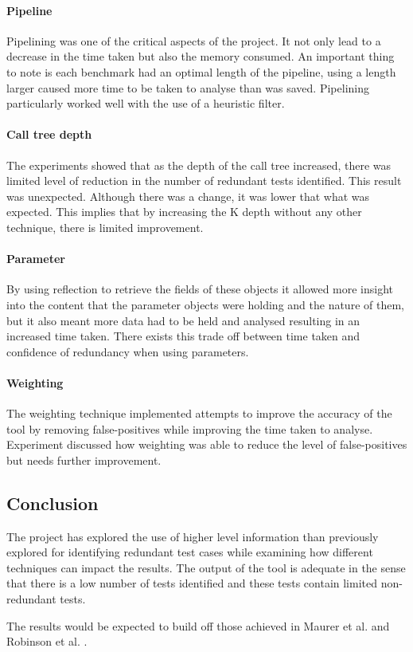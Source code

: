 \paragraph{Pipeline}
Pipelining was one of the critical aspects of the project. It not only lead to a decrease in the time taken but also the memory consumed. An important thing to note is each benchmark had an optimal length of the pipeline, using a length larger caused more time to be taken to analyse than was saved. Pipelining particularly worked well with the use of a heuristic filter.

\paragraph{Call tree depth}
The experiments showed that as the depth of the call tree increased, there was limited level of reduction in the number of redundant tests identified. This result was unexpected. Although there was a change, it was lower that what was expected. This implies that by increasing the K depth without any other technique, there is limited improvement. 

\paragraph{Parameter}
By using reflection to retrieve the fields of these objects it allowed more insight into the content that the parameter objects were holding and the nature of them, but it also meant more data had to be held and analysed resulting in an increased time taken. There exists this trade off between time taken and confidence of redundancy when using parameters. 

\paragraph{Weighting}
The weighting technique implemented attempts to improve the accuracy of the tool by removing false-positives while improving the time taken to analyse. Experiment  discussed how weighting was able to reduce the level of false-positives but needs further improvement.

\subsection{Conclusion}

The project has explored the use of higher level information than previously explored for identifying redundant test cases while examining how different techniques can impact the results. The output of the tool is adequate in the sense that there is a low number of tests identified and these tests contain limited non-redundant tests. 


The results would be expected to build off those achieved in Maurer et al. \cite{li2008static}  and Robinson et al. \cite{koochakzadeh2009test}. 


